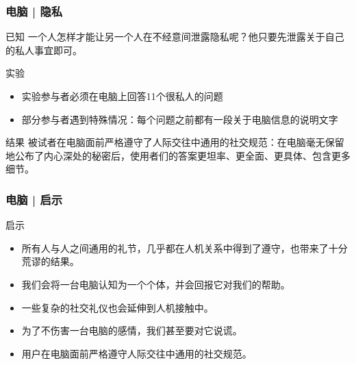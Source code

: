 \begin{frame}
  \frametitle{电脑 | 隐私}
  \begin{block}{已知}
    一个人怎样才能让另一个人在不经意间泄露隐私呢？他只要先泄露关于自己的私人事宜即可。
  \end{block}
  \pause
  \begin{block}{实验}
    \begin{itemize}
      \item 实验参与者必须在电脑上回答11个很私人的问题
      \item 部分参与者遇到特殊情况：每个问题之前都有一段关于电脑信息的说明文字
    \end{itemize}
  \end{block}
  \pause
  \begin{block}{结果}
    被试者在电脑面前严格遵守了人际交往中通用的社交规范：在电脑毫无保留地公布了内心深处的秘密后，使用者们的答案更坦率、更全面、更具体、包含更多细节。
  \end{block}
\end{frame}

\begin{frame}
  \frametitle{电脑 | 启示}
  \begin{block}{启示}
    \begin{itemize}
      \item \alert{所有人与人之间通用的礼节，几乎都在人机关系中得到了遵守}，也带来了十分荒谬的结果。
      \item 我们会将一台电脑认知为一个个体，并会回报它对我们的帮助。
      \item 一些复杂的社交礼仪也会延伸到人机接触中。
      \item 为了不伤害一台电脑的感情，我们甚至要对它说谎。
      \item 用户在电脑面前严格遵守人际交往中通用的社交规范。
    \end{itemize}
  \end{block}
\end{frame}

